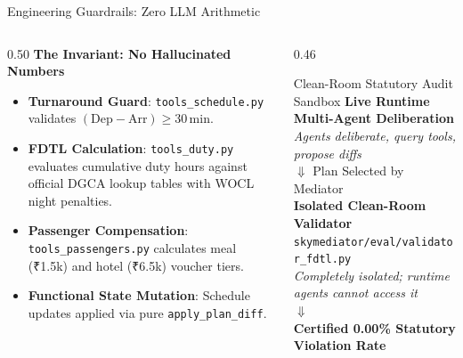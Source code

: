 \documentclass[aspectratio=169,10pt]{beamer}
\begin{document}
\begin{frame}{Engineering Guardrails: Zero LLM Arithmetic}
  \begin{columns}[t]
    \begin{column}{0.50\textwidth}
      \textbf{The Invariant: No Hallucinated Numbers}
      \begin{itemize}\footnotesize
        \item \textbf{Turnaround Guard}: \texttt{tools\_schedule.py} validates $(\text{Dep} - \text{Arr}) \ge 30\,$min.
        \item \textbf{FDTL Calculation}: \texttt{tools\_duty.py} evaluates cumulative duty hours against official DGCA lookup tables with WOCL night penalties.
        \item \textbf{Passenger Compensation}: \texttt{tools\_passengers.py} calculates meal (₹1.5k) and hotel (₹6.5k) voucher tiers.
        \item \textbf{Functional State Mutation}: Schedule updates applied via pure \texttt{apply\_plan\_diff}.
      \end{itemize}
    \end{column}
    \begin{column}{0.46\textwidth}
      \begin{block}{Clean-Room Statutory Audit Sandbox}
        \centering\footnotesize
        \textbf{Live Runtime Multi-Agent Deliberation}\\
        \textit{Agents deliberate, query tools, propose diffs}\\
        $\Downarrow$ Plan Selected by Mediator\\
        \textbf{\color{CrimsonRed}Isolated Clean-Room Validator}\\
        \texttt{skymediator/eval/validator\_fdtl.py}\\
        \textit{Completely isolated; runtime agents cannot access it}\\
        $\Downarrow$\\
        \textbf{\color{EmeraldGreen}Certified 0.00\% Statutory Violation Rate}
      \end{block}
    \end{column}
  \end{columns}
\end{frame}
\end{document}
